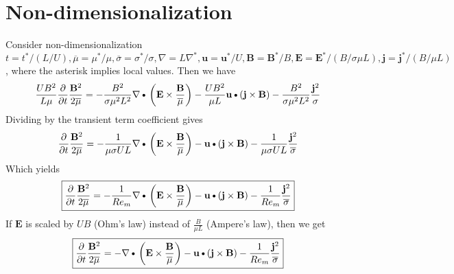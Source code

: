 \documentclass[11pt]{article}
\newcommand{\B}{\mathbf{B}}
\newcommand{\PD}{\partial}
\newcommand{\J}{\mathbf{j}}
\newcommand{\E}{\mathbf{E}}
\newcommand{\JSS}{\frac{\mathbf{j}^2}{\sigma}}
\newcommand{\U}{\mathbf{u}}
\newcommand{\MO}{\overline{\mu}}
\newcommand{\SO}{\overline{\sigma}}
\newcommand{\DOT}{\text{\textbullet}}
\begin{document}
\section{Non-dimensionalization}
Consider non-dimensionalization $t=t^*/(L/U), \MO = \mu^*/\mu, \SO = \sigma^*/\sigma, \nabla = L \nabla^*, \U = \U^*/U, \B = \B^*/B, \E = \E^* / (B/ \sigma \mu L), \J = \J^* / (B/\mu L)$, where the asterisk implies local values. Then we have
\begin{equation}
	\frac{UB^2}{L \mu}
	\frac{\PD }{\PD t} \frac{\B^2}{2 \MO}
	=
	- \frac{B^2}{\sigma \mu^2 L^2} \nabla \DOT \left(\E \times \frac{\B}{\MO} \right)
	- \frac{U B^2}{\mu L} \U \DOT (\J \times \B)
	- \frac{B^2}{\sigma \mu^2 L^2} \JSS
\end{equation}
Dividing by the transient term coefficient gives
\begin{equation}
	\frac{\PD }{\PD t} \frac{\B^2}{2 \MO}
	=
	- \frac{1}{\mu \sigma U L} \nabla \DOT \left(\E \times \frac{\B}{\MO} \right)
	- \U \DOT (\J \times \B)
	- \frac{1}{\mu \sigma U L} \frac{\J^2}{\SO}
\end{equation}
Which yields
\begin{equation} \label{eq:nrg}
	\boxed{
	\frac{\PD }{\PD t} \frac{\B^2}{2 \MO}
	=
	- \frac{1}{Re_m} \nabla \DOT \left(\E \times \frac{\B}{\MO} \right)
	- \U \DOT (\J \times \B)
	- \frac{1}{Re_m} \frac{\J^2}{\SO}
	}
\end{equation}
If $\E$ is scaled by $UB$ (Ohm's law) instead of $\frac{B}{\mu L}$ (Ampere's law), then we get
\begin{equation}
	\boxed{
	\frac{\PD }{\PD t} \frac{\B^2}{2 \MO}
	=
	- \nabla \DOT \left(\E \times \frac{\B}{\MO} \right)
	- \U \DOT (\J \times \B)
	- \frac{1}{Re_m} \frac{\J^2}{\SO}
	}
\end{equation}
\end{document}

